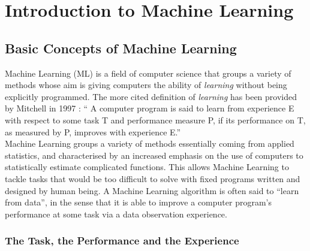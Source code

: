 
\chapter{Introduction to Machine Learning} %

\label{ChapterIntroML}


\section{Basic Concepts of Machine Learning}
Machine Learning (ML) is a field of computer science that groups a variety of  methods whose aim is giving computers the ability of \emph{learning} without being explicitly programmed. The more cited definition of \emph{learning} has been provided by Mitchell in 1997 \cite{Mitchell1997}: \enquote{ A computer program is said to learn from experience E with respect to some task T and performance measure P, if its performance on T, as measured by P, improves with experience E.} \\
Machine Learning groups a variety of methods essentially coming from applied statistics, and characterised by an increased emphasis on the use of computers to statistically estimate complicated functions. This allows Machine Learning to tackle tasks that would be too difficult to solve with fixed programs written and designed by human being. A Machine Learning algorithm is often said to \enquote{learn from data}, in the sense that it is able to improve a computer program's performance at some task via a data observation experience.

\subsection{The Task, the Performance and the Experience}\label{sec:TPE}
